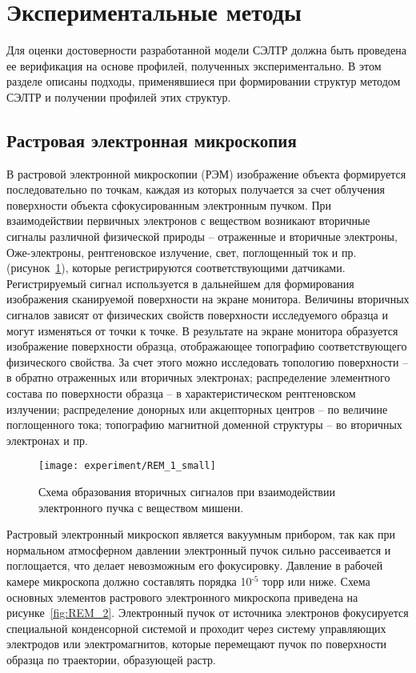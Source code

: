 \section{Экспериментальные методы}

Для оценки достоверности разработанной модели СЭЛТР должна быть проведена ее верификация на основе профилей, полученных экспериментально. В этом разделе описаны подходы, применявшиеся при формировании структур методом СЭЛТР и получении профилей этих структур.

\subsection*{Растровая электронная микроскопия}

В растровой электронной микроскопии (РЭМ) изображение объекта формируется последовательно по точкам, каждая из которых получается за счет облучения поверхности объекта сфокусированным электронным пучком. При взаимодействии первичных электронов с веществом возникают вторичные сигналы различной физической природы -- отраженные и вторичные электроны, Оже-электроны, рентгеновское излучение, свет, поглощенный ток и пр. (рисунок~\ref{fig:REM_1}), которые регистрируются соответствующими датчиками. Регистрируемый сигнал используется в дальнейшем для формирования изображения сканируемой поверхности на экране монитора. Величины вторичных сигналов зависят от физических свойств поверхности исследуемого образца и могут изменяться от точки к точке. В результате на экране монитора образуется изображение поверхности образца, отображающее топографию соответствующего физического свойства. За счет этого можно исследовать топологию поверхности -- в обратно отраженных или вторичных электронах; распределение элементного состава по поверхности образца -- в характеристическом рентгеновском излучении; распределение донорных или акцепторных центров -- по величине поглощенного тока; топографию магнитной доменной структуры -- во вторичных электронах и пр.

\begin{figure}
	\centering
	\texttt{[image: experiment/REM\_1\_small]}
	\caption{Схема образования вторичных сигналов при взаимодействии электронного пучка с веществом мишени.}
	\label{fig:REM_1}
\end{figure}

Растровый электронный микроскоп является вакуумным прибором, так как при нормальном атмосферном давлении электронный пучок сильно рассеивается и поглощается, что делает невозможным его фокусировку. Давление в рабочей камере микроскопа должно составлять порядка 10$^\text{-5}$ торр или ниже. Схема основных элементов растрового электронного микроскопа приведена на рисунке~\ref{fig:REM_2}. Электронный пучок от источника электронов фокусируется специальной конденсорной системой и проходит через систему управляющих электродов или электромагнитов, которые перемещают пучок по поверхности образца по траектории, образующей растр.

